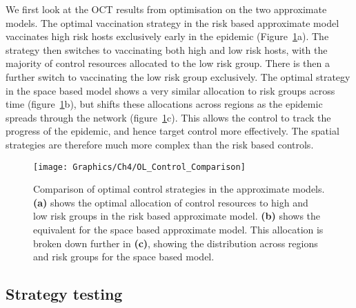 We first look at the OCT results from optimisation on the two approximate models. The optimal vaccination strategy in the risk based approximate model vaccinates high risk hosts exclusively early in the epidemic (Figure~\ref{fig:ch4:opt_control_comparison}a). The strategy then switches to vaccinating both high and low risk hosts, with the majority of control resources allocated to the low risk group. There is then a further switch to vaccinating the low risk group exclusively. The optimal strategy in the space based model shows a very similar allocation to risk groups across time (figure~\ref{fig:ch4:opt_control_comparison}b), but shifts these allocations across regions as the epidemic spreads through the network (figure~\ref{fig:ch4:opt_control_comparison}c). This allows the control to track the progress of the epidemic, and hence target control more effectively. The spatial strategies are therefore much more complex than the risk based controls.

\begin{figure}[h]
    \begin{center}
        \texttt{[image: Graphics/Ch4/OL\_Control\_Comparison]}
        \caption{Comparison of optimal control strategies in the approximate models. \textbf{(a)} shows the optimal allocation of control resources to high and low risk groups in the risk based approximate model. \textbf{(b)} shows the equivalent for the space based approximate model. This allocation is broken down further in \textbf{(c)}, showing the distribution across regions and risk groups for the space based model.}
        \label{fig:ch4:opt_control_comparison}
    \end{center}
\end{figure}

\subsection{Strategy testing}

